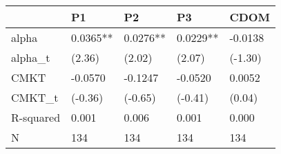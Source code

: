\begin{tabular}{lllll}
\toprule
 & P1 & P2 & P3 & CDOM \\
\midrule
alpha & 0.0365** & 0.0276** & 0.0229** & -0.0138 \\
alpha_t & (2.36) & (2.02) & (2.07) & (-1.30) \\
CMKT & -0.0570 & -0.1247 & -0.0520 & 0.0052 \\
CMKT_t & (-0.36) & (-0.65) & (-0.41) & (0.04) \\
R-squared & 0.001 & 0.006 & 0.001 & 0.000 \\
N & 134 & 134 & 134 & 134 \\
\bottomrule
\end{tabular}
